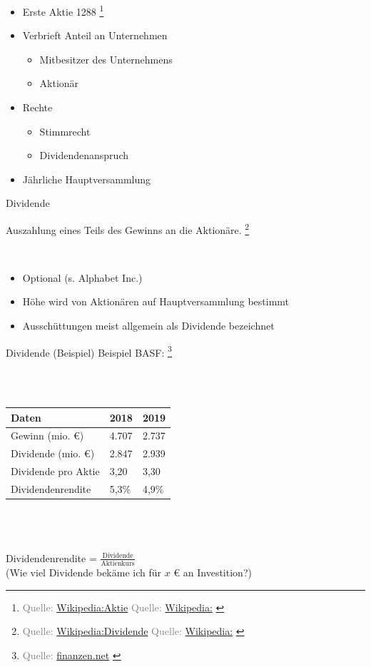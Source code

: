 \documentclass{beamer}
\let\oldfootnote\footnote
\renewcommand{\footnote}[1]
{%
	\oldfootnote
	{
		\tiny
		\textcolor{gray}{#1}
	}%
}
\newcommand{\citewiki}[2][]
{%
	\footnote
	{
		\ifthenelse{\isempty{#1}}
		{
			Quelle: \href{https://de.wikipedia.org/wiki/#2}{Wikipedia:#2}
		}
		{
			Quelle: \href{https://de.wikipedia.org/wiki/#2}{Wikipedia:#1}
		}
	}
}
\newcommand{\citeurl}[2]
{
	\footnote
	{
		\tiny
		\textcolor{gray}
		{
			Quelle: \href{#1}{#2}
		}
	}
}
\begin{document}
			\begin{frame}
				\begin{itemize}
					\item Erste Aktie 1288\citewiki{Aktie}
					\item Verbrieft Anteil an Unternehmen
					\begin{itemize}
						\item Mitbesitzer des Unternehmens
						\item Aktionär
					\end{itemize}
					\item Rechte
					\begin{itemize}
						\item Stimmrecht
						\item Dividendenanspruch
					\end{itemize}
					\item Jährliche Hauptversammlung
				\end{itemize}
			\end{frame}
		
			\begin{frame}{Dividende}
				\begin{definition}
					Auszahlung eines Teils des Gewinns an die Aktionäre.\citewiki{Dividende}
				\end{definition}
				\hfill\\
				\begin{itemize}
					\item Optional (s. Alphabet Inc.)
					\item Höhe wird von Aktionären auf Hauptversammlung bestimmt
					\item Ausschüttungen meist allgemein als Dividende bezeichnet
				\end{itemize}
			\end{frame}
				
			\begin{frame}{Dividende (Beispiel)}
				Beispiel BASF:\citeurl{https://www.finanzen.net/bilanz_guv/basf}{finanzen.net}\\
				\hfill\\
				\begin{tabularx}{\linewidth}{X|X|X}
					Daten & 2018 & 2019\\
					\hline\hline
					Gewinn (mio. €)		& 4.707	& 2.737 \\
					Dividende (mio. €)	& 2.847	& 2.939 \\
					Dividende pro Aktie	& 3,20	& 3,30 \\
					Dividendenrendite	& 5,3\%	& 4,9\%
				\end{tabularx}\\
				\hfill\\
				\hfill\\\pause
				Dividendenrendite = $\frac{\text{Dividende}}{\text{Aktienkurs}}$\\
				{\tiny (Wie viel Dividende bekäme ich für $x$ € an Investition?)}
			\end{frame}
		
\end{document}
